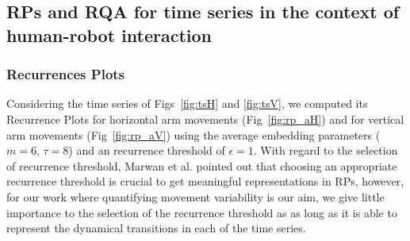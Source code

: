 \subsection{RPs and RQA for time series in the context of human-robot interaction}

\subsubsection{Recurrences Plots}
Considering the time series of Figs~\ref{fig:tsH} and \ref{fig:tsV}, 
we computed its Recurrence Plots
for horizontal arm movements (Fig~\ref{fig:rp_aH}) and
for vertical arm movements (Fig~\ref{fig:rp_aV}) 
using the average embedding parameters ($m=6$, $\tau=8$) 
and an recurrence threshold of $\epsilon=1$.
With regard to the selection of recurrence threshold,
Marwan et al. \cite{marwan2011} pointed out that choosing an appropriate recurrence threshold 
is crucial to get meaningful representations in RPs, however, 
for our work where quantifying movement variability is our aim,
we give little importance to the selection of the recurrence threshold as
as long as it is able to represent the dynamical transitions 
in each of the time series.

